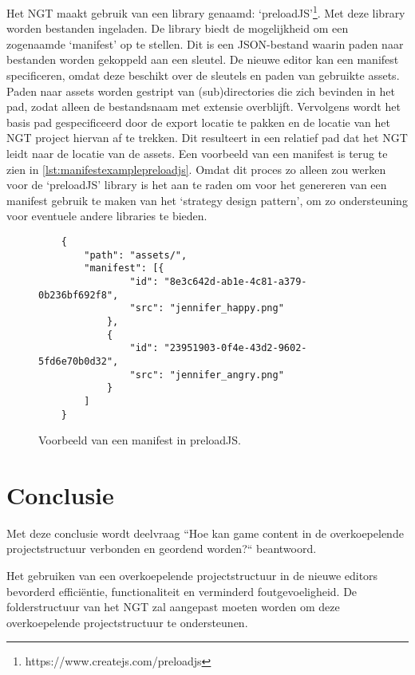Het NGT maakt gebruik van een library genaamd: ‘preloadJS’\footnote{https://www.createjs.com/preloadjs}. Met deze library worden bestanden ingeladen. De library biedt de mogelijkheid om een zogenaamde ‘manifest’ op te stellen. Dit is een JSON-bestand waarin paden naar bestanden worden gekoppeld aan een sleutel. De nieuwe editor kan een manifest specificeren, omdat deze beschikt over de sleutels en paden van gebruikte assets. Paden naar assets worden gestript van (sub)directories die zich bevinden in het pad, zodat alleen de bestandsnaam met extensie overblijft. Vervolgens wordt het basis pad gespecificeerd door de export locatie te pakken en de locatie van het NGT project hiervan af te trekken. Dit resulteert in een relatief pad dat het NGT leidt naar de locatie van de assets. Een voorbeeld van een manifest is terug te zien in \autoref{lst:manifestexamplepreloadjs}. Omdat dit proces zo alleen zou werken voor de ‘preloadJS’ library is het aan te raden om voor het genereren van een manifest gebruik te maken van het ‘strategy design pattern’, om zo ondersteuning voor eventuele andere libraries te bieden.

\begin{figure}[htb]
    \centering
    \lstset{language=JavaScript}
    \begin{lstlisting}
    {
        "path": "assets/",
        "manifest": [{
                "id": "8e3c642d-ab1e-4c81-a379-0b236bf692f8",
                "src": "jennifer_happy.png"
            },
            {
                "id": "23951903-0f4e-43d2-9602-5fd6e70b0d32",
                "src": "jennifer_angry.png"
            }
        ]
    }               
    \end{lstlisting}
    \caption{Voorbeeld van een manifest in preloadJS.}
    \label{lst:manifestexamplepreloadjs}
\end{figure}

\section{Conclusie}
Met deze conclusie wordt deelvraag “Hoe kan game content in de overkoepelende projectstructuur verbonden en geordend worden?“ beantwoord.

Het gebruiken van een overkoepelende projectstructuur in de nieuwe editors bevorderd efficiëntie, functionaliteit en verminderd foutgevoeligheid. De folderstructuur van het NGT zal aangepast moeten worden om deze overkoepelende projectstructuur te ondersteunen.

